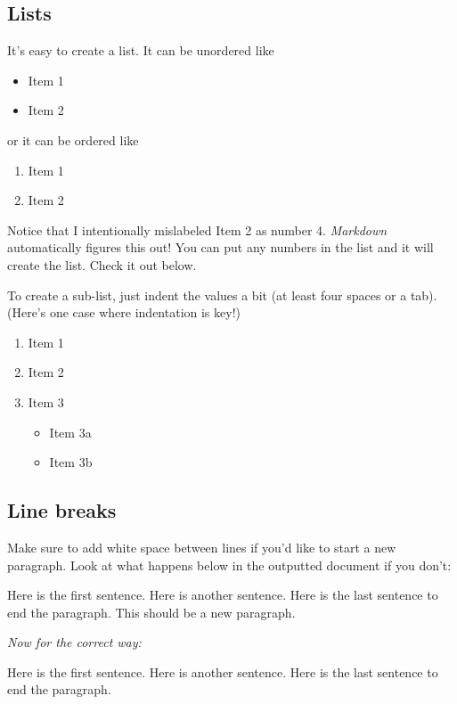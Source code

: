 \documentclass[12pt,oneside]{chicagocapstone}
\providecommand{\tightlist}{%
  \setlength{\itemsep}{0pt}\setlength{\parskip}{0pt}}
\begin{document}
\hypertarget{lists}{%
\subsection*{Lists}\label{lists}}

It's easy to create a list. It can be unordered like
\begin{itemize}
\tightlist
\item
  Item 1
\item
  Item 2
\end{itemize}
or it can be ordered like
\begin{enumerate}
\def\labelenumi{\arabic{enumi}.}
\tightlist
\item
  Item 1
\item
  Item 2
\end{enumerate}
Notice that I intentionally mislabeled Item 2 as number 4. \emph{Markdown} automatically figures this out! You can put any numbers in the list and it will create the list. Check it out below.

To create a sub-list, just indent the values a bit (at least four spaces or a tab). (Here's one case where indentation is key!)
\begin{enumerate}
\def\labelenumi{\arabic{enumi}.}
\tightlist
\item
  Item 1
\item
  Item 2
\item
  Item 3
  \begin{itemize}
  \tightlist
  \item
    Item 3a
  \item
    Item 3b
  \end{itemize}
\end{enumerate}
\hypertarget{line-breaks}{%
\subsection*{Line breaks}\label{line-breaks}}

Make sure to add white space between lines if you'd like to start a new paragraph. Look at what happens below in the outputted document if you don't:

Here is the first sentence. Here is another sentence. Here is the last sentence to end the paragraph.
This should be a new paragraph.

\emph{Now for the correct way:}

Here is the first sentence. Here is another sentence. Here is the last sentence to end the paragraph.
\end{document}
